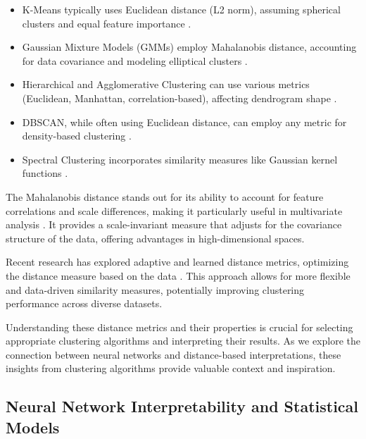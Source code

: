 \begin{itemize}
    \item K-Means typically uses Euclidean distance (L2 norm), assuming spherical clusters and equal feature importance \citep{macqueen1967some}.
    
    \item Gaussian Mixture Models (GMMs) employ Mahalanobis distance, accounting for data covariance and modeling elliptical clusters \citep{reynolds2009gaussian}.
    
    \item Hierarchical and Agglomerative Clustering can use various metrics (Euclidean, Manhattan, correlation-based), affecting dendrogram shape \citep{murtagh1983survey}.
    
    \item DBSCAN, while often using Euclidean distance, can employ any metric for density-based clustering \citep{ester1996density}.
    
    \item Spectral Clustering incorporates similarity measures like Gaussian kernel functions \citep{von2007tutorial}.
\end{itemize}

The Mahalanobis distance stands out for its ability to account for feature correlations and scale differences, making it particularly useful in multivariate analysis \citep{mahalanobis1936generalized}. It provides a scale-invariant measure that adjusts for the covariance structure of the data, offering advantages in high-dimensional spaces.

Recent research has explored adaptive and learned distance metrics, optimizing the distance measure based on the data \citep{weinberger2009distance}. This approach allows for more flexible and data-driven similarity measures, potentially improving clustering performance across diverse datasets.

Understanding these distance metrics and their properties is crucial for selecting appropriate clustering algorithms and interpreting their results. As we explore the connection between neural networks and distance-based interpretations, these insights from clustering algorithms provide valuable context and inspiration.

\subsection{Neural Network Interpretability and Statistical Models}


